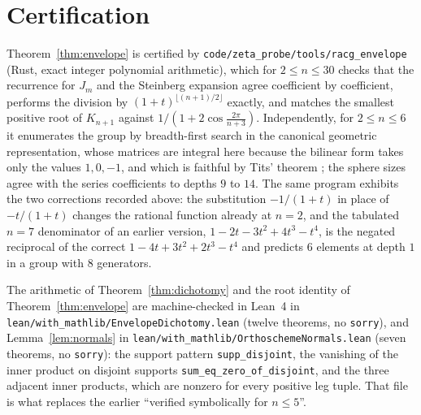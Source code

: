 \documentclass[11pt]{article}
\theoremstyle{definition}
\begin{document}
\section*{Certification}

Theorem~\ref{thm:envelope} is certified by \texttt{code/zeta\_probe/tools/racg\_envelope} (Rust, exact
integer polynomial arithmetic), which for $2\le n\le30$ checks that the recurrence for $J_m$ and the
Steinberg expansion agree coefficient by coefficient, performs the division by
$(1+t)^{\lfloor(n+1)/2\rfloor}$ exactly, and matches the smallest positive root of $K_{n+1}$ against
$1/(1+2\cos\frac{2\pi}{n+3})$. Independently, for $2\le n\le6$ it enumerates the group by breadth-first
search in the canonical geometric representation, whose matrices are integral here because the bilinear
form takes only the values $1,0,-1$, and which is faithful by Tits' theorem \cite{Bourbaki}; the sphere
sizes agree with the series coefficients to depths $9$ to $14$. The same program exhibits the two
corrections recorded above: the substitution $-1/(1+t)$ in place of $-t/(1+t)$ changes the rational
function already at $n=2$, and the tabulated $n=7$ denominator of an earlier version,
$1-2t-3t^2+4t^3-t^4$, is the negated reciprocal of the correct $1-4t+3t^2+2t^3-t^4$ and predicts $6$
elements at depth $1$ in a group with $8$ generators.

The arithmetic of Theorem~\ref{thm:dichotomy} and the root identity of Theorem~\ref{thm:envelope} are
machine-checked in Lean~4 in \texttt{lean/with\_mathlib/EnvelopeDichotomy.lean} (twelve theorems,
no \texttt{sorry}), and Lemma~\ref{lem:normals} in
\texttt{lean/with\_mathlib/OrthoschemeNormals.lean} (seven theorems, no \texttt{sorry}): the
support pattern \texttt{supp\_disjoint}, the vanishing of the inner product on disjoint supports
\texttt{sum\_eq\_zero\_of\_disjoint}, and the three adjacent inner products, which are nonzero for
every positive leg tuple. That file is what replaces the earlier ``verified symbolically for
$n\le5$''.
\end{document}
